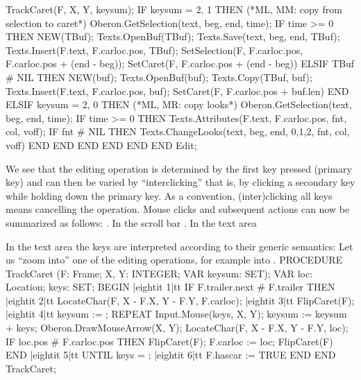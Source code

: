       TrackCaret(F, X, Y, keysum);
      IF keysum = {2, 1} THEN (*ML, MM: copy from selection to caret*)
        Oberon.GetSelection(text, beg, end, time);
        IF time >= 0 THEN
          NEW(TBuf); Texts.OpenBuf(TBuf);
          Texts.Save(text, beg, end, TBuf);
          Texts.Insert(F.text, F.carloc.pos, TBuf);
          SetSelection(F, F.carloc.pos, F.carloc.pos + (end - beg));
          SetCaret(F, F.carloc.pos + (end - beg))
        ELSIF TBuf # NIL THEN
          NEW(buf); Texts.OpenBuf(buf);
          Texts.Copy(TBuf, buf);
          Texts.Insert(F.text, F.carloc.pos, buf);
          SetCaret(F, F.carloc.pos + buf.len)
        END
      ELSIF keysum = {2, 0} THEN (*ML, MR: copy looks*)
        Oberon.GetSelection(text, beg, end, time);
        IF time >= 0 THEN
          Texts.Attributes(F.text, F.carloc.pos, fnt, col, voff);
          IF fnt # NIL THEN Texts.ChangeLooks(text, beg, end, {0,1,2}, fnt, col, voff) END
        END
      END
    END
  END
END Edit;
\endtt

\noindent We see that the editing operation is determined by the first key pressed (primary key) and can then be varied by ``interclicking'' that is, by clicking a secondary key while holding down the primary key. As a convention, (inter)clicking all keys means cancelling the operation. Mouse clicks and subsequent actions can now be summarized as follows:
\medskip
{}. In the scroll bar
\medskip
{}
\medskip{}. In the text area
\medskip
{}

\medskip
\noindent In the text area the keys are interpreted according to their generic semantics:
\medskip
{}
\medskip
\noindent Let us ``zoom into'' one of the editing operations,
for example into .
\begintt
PROCEDURE TrackCaret (F: Frame; X, Y: INTEGER; VAR keysum: SET);
VAR loc: Location; keys: SET;
BEGIN
|eightit 1|tt IF F.trailer.next # F.trailer THEN
|eightit 2|tt   LocateChar(F, X - F.X, Y - F.Y, F.carloc);
|eightit 3|tt   FlipCaret(F);
|eightit 4|tt   keysum := {};
    REPEAT
      Input.Mouse(keys, X, Y); keysum := keysum + keys;
      Oberon.DrawMouseArrow(X, Y);
      LocateChar(F, X - F.X, Y - F.Y, loc);
      IF loc.pos # F.carloc.pos THEN
        FlipCaret(F);
        F.carloc := loc;
        FlipCaret(F)
      END
|eightit 5|tt  UNTIL keys = {};
|eightit 6|tt  F.hascar := TRUE
  END
END TrackCaret;
\endtt


